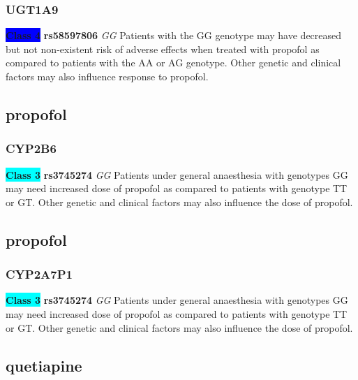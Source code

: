 \documentclass{book}
\begin{document}
\subsubsection{ UGT1A9 }

\begin{center}

\textbf{\colorbox{blue} {Class 4}} \textbf{ rs58597806 } \textit{ GG }
Patients with the GG genotype may have decreased but not non-existent risk of adverse effects when treated with propofol as compared to patients with the AA or AG genotype. Other genetic and clinical factors may also influence response to propofol.

\end{center}\subsection{ propofol }


\subsubsection{ CYP2B6 }

\begin{center}
\textbf{\colorbox{cyan} {Class 3}} \textbf{ rs3745274 } \textit{ GG }
Patients under general anaesthesia with genotypes GG may need increased dose of propofol as compared to patients with genotype TT or GT. Other genetic and clinical factors may also influence the dose of propofol. 


\end{center}\subsection{ propofol }


\subsubsection{ CYP2A7P1 }

\begin{center}
\textbf{\colorbox{cyan} {Class 3}} \textbf{ rs3745274 } \textit{ GG }
Patients under general anaesthesia with genotypes GG may need increased dose of propofol as compared to patients with genotype TT or GT. Other genetic and clinical factors may also influence the dose of propofol. 


\end{center}\subsection{ quetiapine }
\end{document}

